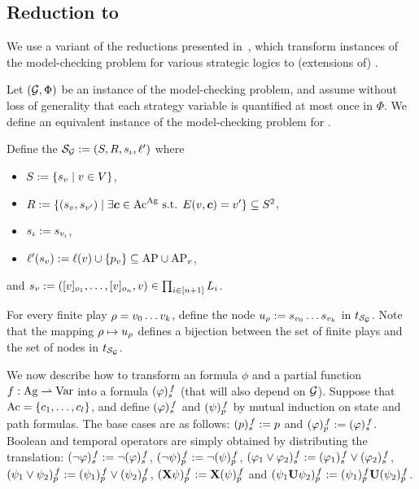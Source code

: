 \subsection{Reduction to \QCTLs}
\label{sec-reduction}

We use a variant of the reductions presented
in~\cite{DBLP:journals/iandc/LaroussinieM15,BMMRV17,DBLP:conf/csl/FijalkowMMR18,DBLP:conf/ijcai/BouyerKMMMP19},
which transform instances of the model-checking problem for various strategic
logics to (extensions of) \QCTLs.

Let $(\CGS,\Phi)$ be an instance of the \SL
model-checking problem, and assume without loss of generality that
each strategy variable is quantified at most once in $\Phi$. We define an equivalent instance of the
model-checking problem for \QCTLs.

Define the \KS $\KS_{\CGS}\egdef(\setstates,\relation,\sstate_{\init},\lab')$ where
\begin{itemize}
\item $\setstates\egdef\{\sstate_{\pos} \mid \pos\in\setpos\}$,
\item $\relation\egdef\{(\sstate_{\pos},\sstate_{\pos'})\mid
  \exists\jmov\in\Mov^{\Agf} \mbox{ s.t. }\trans(\pos,\jmov)=\pos'\}
  \subseteq \setstates^2$,
  \item $\sstate_{\init}\egdef\sstate_{\pos_{\init}}$,
\item $\lab'(\sstate_{\pos})\egdef\val(\pos)\union \{p_{\pos}\} \subseteq \APf \cup \APv$,
\end{itemize}
and $\sstate_{\pos}\egdef(\eqc{\obs_{1}},\ldots,\eqc{\obs_{n}},\pos) \in \prod_{i\in [n+1]}\setlstates_{i}$.


For every finite play $\fplay=\pos_{0}\ldots\pos_{k}$, define
the node $\noeud_{\fplay}\egdef \sstate_{\pos_{0}}\ldots \sstate_{\pos_{k}}$ in
$\unfold[\KS_{\CGS}]{\sstate_{\pos_{0}}}$.  Note that the mapping
$\fplay\mapsto\noeud_{\fplay}$ defines a bijection between the set
of finite plays and the set of
nodes in $\unfold[\KS_{\CGS}]{\sstate_{\init}}$.

\halfline
{}
 We now describe how to transform an \SLref formula $\phi$ and a partial
function $f:\Agf \partialto  \Varf$ into a \QCTLs
formula $\tr[f]{\phi}$ (that will also depend on $\CGS$).
Suppose that $\Mov=\{\mov_{1},\ldots,\mov_{\maxmov}\}$, and define
$\tr[f]{\phi}$ and $\trp[f]{\psi}$ by mutual induction on state and path formulas. 
The base cases are as follows:
$\tr[f]{p} 		 \egdef p$ and $\trp[f]{\phi} \egdef
\tr[f]{\phi}$. Boolean and temporal operators are simply obtained by
distributing the translation:
$\tr[f]{\neg \phi} 	 \egdef \neg \tr[f]{\phi}$, $\trp[f]{\neg
  \psi} \egdef \neg \trp[f]{\psi}$,
$\tr[f]{\phi_1\ou\phi_2}  \egdef \tr[f]{\phi_1}\ou\tr[f]{\phi_2}$,
$\trp[f]{\psi_1\ou\psi_2}  \egdef \trp[f]{\psi_1}\ou\trp[f]{\psi_2}$,
$\trp[f]{\X\psi}  \egdef \X\trp[f]{\psi}$ and $\trp[f]{\psi_1\until\psi_2}  \egdef \trp[f]{\psi_1}\until\trp[f]{\psi_2}$.



